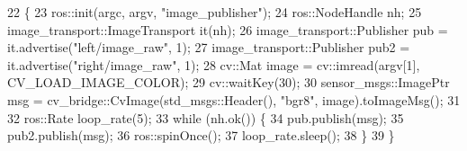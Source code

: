 \begin{DoxyCode}
22 \{
23   ros::init(argc, argv, \textcolor{stringliteral}{"image\_publisher"});
24   ros::NodeHandle nh;
25   image\_transport::ImageTransport it(nh);
26   image\_transport::Publisher pub = it.advertise(\textcolor{stringliteral}{"left/image\_raw"}, 1);
27   image\_transport::Publisher pub2 = it.advertise(\textcolor{stringliteral}{"right/image\_raw"}, 1);
28   cv::Mat image = cv::imread(argv[1], CV\_LOAD\_IMAGE\_COLOR);
29   cv::waitKey(30);
30   sensor\_msgs::ImagePtr msg = cv\_bridge::CvImage(std\_msgs::Header(), \textcolor{stringliteral}{"bgr8"}, image).toImageMsg();
31 
32   ros::Rate loop\_rate(5);
33   \textcolor{keywordflow}{while} (nh.ok()) \{
34     pub.publish(msg);
35     pub2.publish(msg);
36     ros::spinOnce();
37     loop\_rate.sleep();
38   \}
39 \}
\end{DoxyCode}
